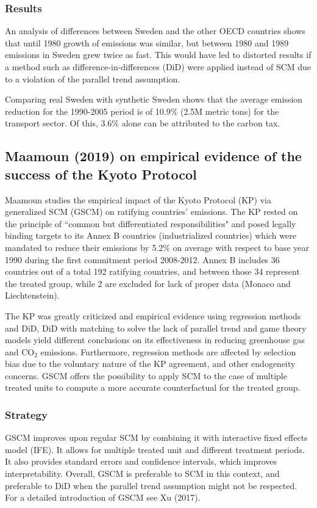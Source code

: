 \documentclass[12pt,a4paper,draft]{article}
\begin{document}
\subsubsection*{Results}
An analysis of differences between Sweden and the other OECD countries shows that 
until 1980 growth of emissions was similar, but between 1980 and 1989 emissions in Sweden 
grew twice as fast. This would have led to distorted results if a method such as 
difference-in-differences (DiD) were applied instead of SCM due to a violation of the 
parallel trend assumption.

Comparing real Sweden with synthetic Sweden shows that the average emission reduction for 
the 1990-2005 period is of 10.9\% (2.5M metric tons) for the transport sector. Of this, 
3.6\% alone can be attributed to the carbon tax.


\subsection{Maamoun (2019) on empirical evidence of the success of the Kyoto Protocol}
Maamoun studies the empirical impact of the Kyoto Protocol (KP) via generalized SCM (GSCM) 
on ratifying countries' emissions. 
The KP rested on the principle of ``common but differentiated responsibilities" and posed 
legally binding targets to its Annex B countries (industrialized countries) which were 
mandated to reduce their emissions by 5.2\% on average with respect to base year 1990 
during the first commitment period 2008-2012. 
Annex B includes 36 countries out of a total 192 ratifying countries, and between those 
34 represent the treated group, while 2 are excluded for lack of proper data (Monaco and 
Liechtenstein).

The KP was greatly criticized and empirical evidence using regression methods and DiD, DiD with 
matching to solve the lack of parallel trend and game theory models yield different conclusions 
on its effectiveness in reducing greenhouse gas and CO$_2$ emissions. Furthermore, 
regression methods are affected by selection bias due to the voluntary nature of the KP 
agreement, and other endogeneity concerns. GSCM offers the possibility to apply SCM to the case 
of multiple treated units to compute a more accurate counterfactual for the treated group. 


\subsubsection*{Strategy}
GSCM improves upon regular SCM by combining it with interactive fixed effects model (IFE). It 
allows for multiple treated unit and different treatment periods. It also provides standard errors 
and confidence intervals, which improves interpretability. Overall, GSCM is preferable to SCM 
in this context, and preferable to DiD when the parallel trend assumption might not be respected. 
For a detailed introduction of GSCM see Xu (2017).
\end{document}
